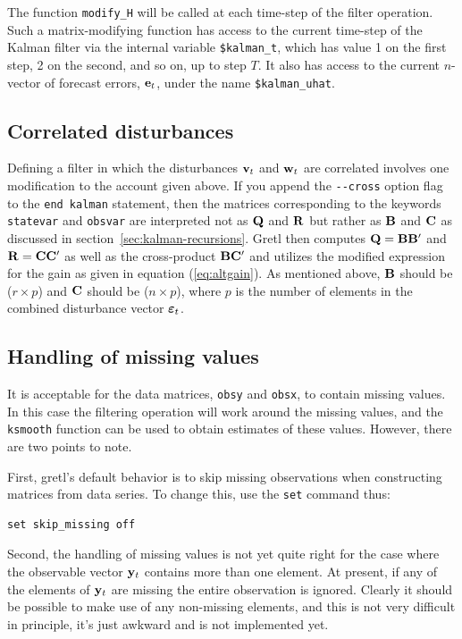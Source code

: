 \documentclass[a4paper]{article}
\newcommand{\obsvec}{\ensuremath\mathbf{y}}
\newcommand{\obsdist}{\ensuremath\mathbf{w}}
\newcommand{\obsvar}{\ensuremath\mathbf{R}}
\newcommand{\strdist}{\ensuremath\mathbf{v}}
\newcommand{\strvar}{\ensuremath\mathbf{Q}}
\newcommand{\altstrvar}{\ensuremath\mathbf{B}}
\newcommand{\altobsvar}{\ensuremath\mathbf{C}}
\newcommand{\alldist}{\ensuremath\mathbf{\bm \varepsilon}}
\newcommand{\prederr}{\ensuremath\mathbf{e}}
\begin{document}
The function \verb+modify_H+ will be called at each time-step of the
filter operation.  Such a matrix-modifying function has access to the
current time-step of the Kalman filter via the internal variable
\verb+$kalman_t+, which has value 1 on the first step, 2 on the
second, and so on, up to step $T$.  It also has access to the
current $n$-vector of forecast errors, $\prederr_t$, under the name
\verb+$kalman_uhat+.

\subsection{Correlated disturbances}

Defining a filter in which the disturbances $\strdist_t$ and
$\obsdist_t$ are correlated involves one modification to the account
given above.  If you append the \verb|--cross| option flag to the
\texttt{end kalman} statement, then the matrices corresponding to
the keywords \texttt{statevar} and \texttt{obsvar} are interpreted
not as $\strvar$ and $\obsvar$ but rather as $\altstrvar$ and
$\altobsvar$ as discussed in section~\ref{sec:kalman-recursions}.
Gretl then computes $\strvar = \altstrvar\altstrvar'$ and
$\obsvar = \altobsvar\altobsvar'$ as well as the cross-product
$\altstrvar\altobsvar'$ and utilizes the modified expression for
the gain as given in equation (\ref{eq:altgain}).  As mentioned
above, $\altstrvar$ should be ($r \times p$) and $\altobsvar$
should be ($n \times p$), where $p$ is the number of elements
in the combined disturbance vector $\alldist_t$.

\subsection{Handling of missing values}

It is acceptable for the data matrices, \texttt{obsy} and
\texttt{obsx}, to contain missing values.  In this case the filtering
operation will work around the missing values, and the \texttt{ksmooth}
function can be used to obtain estimates of these values.  However,
there are two points to note.

First, gretl's default behavior is to skip missing observations when
constructing matrices from data series.  To change this, use the \texttt{set} 
command thus:
%
\begin{verbatim}
set skip_missing off
\end{verbatim}

Second, the handling of missing values is not yet quite right for the
case where the observable vector $\obsvec_t$ contains more than one
element.  At present, if any of the elements of $\obsvec_t$ are
missing the entire observation is ignored.  Clearly it should be
possible to make use of any non-missing elements, and this is not
very difficult in principle, it's just awkward and is not
implemented yet.
\end{document}
